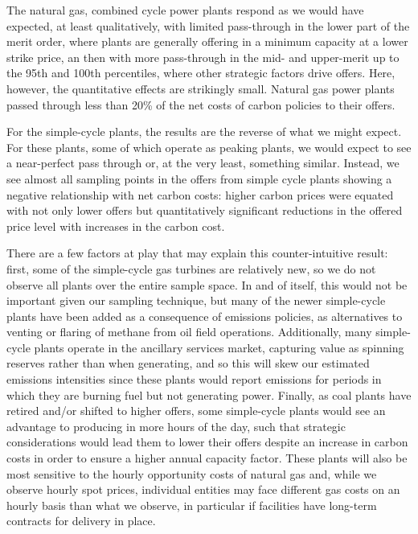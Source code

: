 \documentclass[12pt]{article}
\begin{document}
The natural gas, combined cycle power plants respond as we would have expected, at least qualitatively, with limited pass-through in the lower part of the merit order, where plants are generally offering in a minimum capacity at a lower strike price, an then with more pass-through in the mid- and upper-merit up to the 95th and 100th percentiles, where other strategic factors drive offers. Here, however, the quantitative effects are strikingly small. Natural gas power plants passed through less than 20\% of the net costs of carbon policies to their offers.

For the simple-cycle plants, the results are the reverse of what we might expect. For these plants, some of which operate as peaking plants, we would expect to see a near-perfect pass through or, at the very least, something similar. Instead, we see almost all sampling points in the offers from simple cycle plants showing a negative relationship with net carbon costs: higher carbon prices were equated with not only lower offers but quantitatively significant reductions in the offered price level with increases in the carbon cost.

There are a few factors at play that may explain this counter-intuitive result: first, some of the simple-cycle gas turbines are relatively new, so we do not observe all plants over the entire sample space. In and of itself, this would not be important given our sampling technique, but many of the newer simple-cycle plants have been added as a consequence of emissions policies, as alternatives to venting or flaring of methane from oil field operations. Additionally, many simple-cycle plants operate in the ancillary services market, capturing value as spinning reserves rather than when generating, and so this will skew our estimated emissions intensities since these plants would report emissions for periods in which they are burning fuel but not generating power. Finally, as coal plants have retired and/or shifted to higher offers, some simple-cycle plants would see an advantage to producing in more hours of the day, such that strategic considerations would lead them to lower their offers despite an increase in carbon costs in order to ensure a higher annual capacity factor. These plants will also be most sensitive to the hourly opportunity costs of natural gas and, while we observe hourly spot prices, individual entities may face different gas costs on an hourly basis than what we observe, in particular if facilities have long-term contracts for delivery in place.
\end{document}
